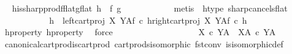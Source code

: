 \begin{isabellebody}
\ \isamarkupfalse%
\ h{\isacharunderscore}{\kern0pt}is{\isacharunderscore}{\kern0pt}sharp{\isacharunderscore}{\kern0pt}prod{\isacharunderscore}{\kern0pt}fflat{\isacharunderscore}{\kern0pt}gflat{\isacharcolon}{\kern0pt}\ {\isachardoublequoteopen}h\ {\isacharequal}{\kern0pt}\ {\isasymlangle}f\isactrlsup {\isasymflat}{\isacharcomma}{\kern0pt}\ g\isactrlsup {\isasymflat}{\isasymrangle}\isactrlsup {\isasymsharp}{\isachardoublequoteclose}\isanewline
\ \ \ \ \ \ \ \ \ \ \isamarkupfalse%
\ {\isacharparenleft}{\kern0pt}metis\ \ h{\isacharunderscore}{\kern0pt}type\ sharp{\isacharunderscore}{\kern0pt}cancels{\isacharunderscore}{\kern0pt}flat{\isacharparenright}{\kern0pt}\isanewline
\ \ \ \ \ \ \ \ \isamarkupfalse%
\ \isamarkupfalse%
\ {\isachardoublequoteopen}h\ {\isacharequal}{\kern0pt}\ {\isasymlangle}{\isacharparenleft}{\kern0pt}left{\isacharunderscore}{\kern0pt}cart{\isacharunderscore}{\kern0pt}proj\ X\ Y\isactrlbsup A\isactrlesup \isactrlsub f\ {\isasymcirc}\isactrlsub c\ h{\isacharparenright}{\kern0pt}\isactrlsup {\isasymflat}{\isacharcomma}{\kern0pt}{\isacharparenleft}{\kern0pt}right{\isacharunderscore}{\kern0pt}cart{\isacharunderscore}{\kern0pt}proj\ X\ Y\isactrlbsup A\isactrlesup \isactrlsub f\ {\isasymcirc}\isactrlsub c\ h{\isacharparenright}{\kern0pt}\isactrlsup {\isasymflat}{\isasymrangle}\isactrlsup {\isasymsharp}{\isachardoublequoteclose}\isanewline
\ \ \ \ \ \ \ \ \ \ \isamarkupfalse%
\ h{\isacharunderscore}{\kern0pt}property{}\ h{\isacharunderscore}{\kern0pt}property{}\ \isamarkupfalse%
\ force\isanewline
\ \ \ \ \ \ \isamarkupfalse%
\isanewline
\ \ \ \ \isamarkupfalse%
\isanewline
\ \ \isamarkupfalse%
\isanewline
\ \ \isamarkupfalse%
\ \isamarkupfalse%
\ {\isachardoublequoteopen}{\isacharparenleft}{\kern0pt}X\ {\isasymtimes}\isactrlsub c\ Y{\isacharparenright}{\kern0pt}\isactrlbsup A\isactrlesup \ {\isasymcong}\ X\isactrlbsup A\isactrlesup \ {\isasymtimes}\isactrlsub c\ Y\isactrlbsup A\isactrlesup {\isachardoublequoteclose}\isanewline
\ \ \ \ \isamarkupfalse%
\ canonical{\isacharunderscore}{\kern0pt}cart{\isacharunderscore}{\kern0pt}prod{\isacharunderscore}{\kern0pt}is{\isacharunderscore}{\kern0pt}cart{\isacharunderscore}{\kern0pt}prod\ cart{\isacharunderscore}{\kern0pt}prods{\isacharunderscore}{\kern0pt}isomorphic\ fst{\isacharunderscore}{\kern0pt}conv\ is{\isacharunderscore}{\kern0pt}isomorphic{\isacharunderscore}{\kern0pt}def\ \isamarkupfalse%

\end{isabellebody}
